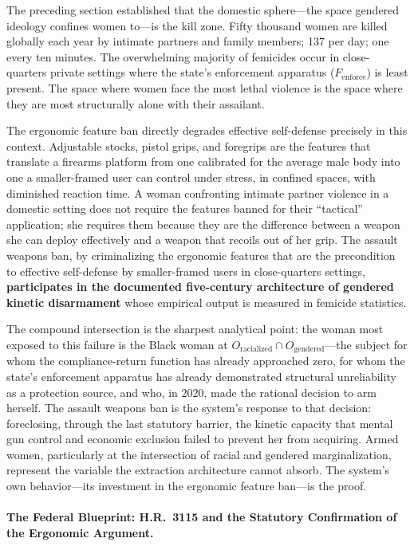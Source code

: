 The preceding section established that the domestic sphere---the space gendered ideology confines women to---is the kill zone. Fifty thousand women are killed globally each year by intimate partners and family members; 137 per day; one every ten minutes. The overwhelming majority of femicides occur in close-quarters private settings where the state's enforcement apparatus ($F_{\text{enforce}}$) is least present. The space where women face the most lethal violence is the space where they are most structurally alone with their assailant.

The ergonomic feature ban directly degrades effective self-defense precisely in this context. Adjustable stocks, pistol grips, and foregrips are the features that translate a firearms platform from one calibrated for the average male body into one a smaller-framed user can control under stress, in confined spaces, with diminished reaction time. A woman confronting intimate partner violence in a domestic setting does not require the features banned for their ``tactical'' application; she requires them because they are the difference between a weapon she can deploy effectively and a weapon that recoils out of her grip. The assault weapons ban, by criminalizing the ergonomic features that are the precondition to effective self-defense by smaller-framed users in close-quarters settings, \textbf{participates in the documented five-century architecture of gendered kinetic disarmament} whose empirical output is measured in femicide statistics.

The compound intersection is the sharpest analytical point: the woman most exposed to this failure is the Black woman at $O_{\text{racialized}} \cap O_{\text{gendered}}$---the subject for whom the compliance-return function has already approached zero, for whom the state's enforcement apparatus has already demonstrated structural unreliability as a protection source, and who, in 2020, made the rational decision to arm herself. The assault weapons ban is the system's response to that decision: foreclosing, through the last statutory barrier, the kinetic capacity that mental gun control and economic exclusion failed to prevent her from acquiring. Armed women, particularly at the intersection of racial and gendered marginalization, represent the variable the extraction architecture cannot absorb. The system's own behavior---its investment in the ergonomic feature ban---is the proof.

\paragraph{The Federal Blueprint: H.R.\ 3115 and the Statutory Confirmation of the Ergonomic Argument.}

